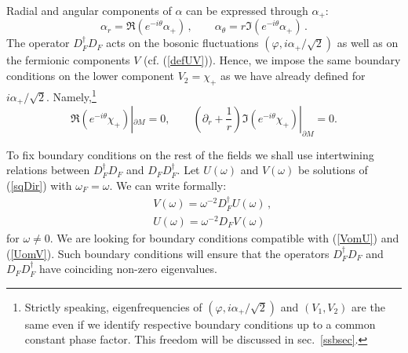 \documentclass[a4paper,12pt]{article}
\begin{document}
Radial and angular components of $\alpha$ can be expressed through
$\alpha_+$:
\begin{equation}
\alpha_r =\Re \left( e^{-i\theta} \alpha_+ \right)\,,\qquad
\alpha_\theta = r \Im \left( e^{-i\theta }\alpha_+ \right)\,.
\label{rthetaplus}
\end{equation}
The operator $D_F^\dag D_F$ acts on the bosonic fluctuations
$(\varphi ,i\alpha_+/\sqrt{2})$ as well as on the fermionic components
$V$ (cf. (\ref{defUV})). Hence, we impose the same boundary 
conditions on the lower component $V_2=\chi_+$ as we have already
defined for $i\alpha_+ /\sqrt{2}$. Namely,\footnote{\label{ft}Strictly 
speaking, eigenfrequencies of $(\varphi ,i\alpha_+/\sqrt{2})$
and $(V_1,V_2)$ are the same even if we identify respective
boundary conditions up to a common constant phase factor. 
This freedom will be discussed in sec.\ \ref{ssbsec}.}
\begin{equation}
\Re \left( e^{-i\theta} \chi_+ \right) |_{\partial M}=0,
\qquad \left( \partial_r +\frac 1r \right) \Im
\left( e^{-i\theta} \chi_+ \right) |_{\partial M}=0.
\label{bcchip}
\end{equation}

To fix boundary conditions on the rest of the fields we shall use
intertwining relations between $D^\dag_F D_F$ and $D_FD_F^\dag$.
Let $U(\omega )$ and $V(\omega )$ be solutions of (\ref{sqDir})
with $\omega_F=\omega$. We can write formally:
\begin{eqnarray}
&&V(\omega )=\omega^{-2} D_F^\dag U(\omega )\,,\label{VomU}\\
&&U(\omega )=\omega^{-2} D_F V(\omega )\label{UomV}
\end{eqnarray}
for $\omega \ne 0$. We are looking for boundary conditions
compatible with (\ref{VomU}) and (\ref{UomV}). Such boundary 
conditions will ensure that the operators $D^\dag_F D_F$ 
and $D_FD_F^\dag$ have coinciding non-zero eigenvalues.
\end{document}
